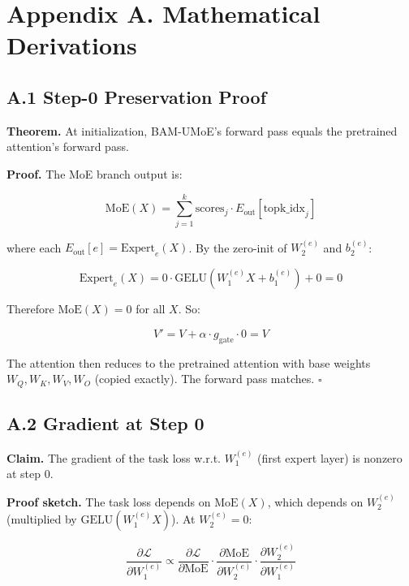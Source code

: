 \section{Appendix A. Mathematical Derivations}

\subsection{A.1 Step-0 Preservation Proof}

\textbf{Theorem.} At initialization, BAM-UMoE's forward pass equals the pretrained 
attention's forward pass.

\textbf{Proof.} The MoE branch output is:

\begin{equation}
\text{MoE}(X) = \sum_{j=1}^{k} \text{scores}_j \cdot E_{\text{out}}[\text{topk\_idx}_j]
\end{equation}

where each $E_\text{out}[e] = \text{Expert}_e(X)$. By the zero-init of 
$W_2^{(e)}$ and $b_2^{(e)}$:

\begin{equation}
\text{Expert}_e(X) = 0 \cdot \text{GELU}(W_1^{(e)} X + b_1^{(e)}) + 0 = 0
\end{equation}

Therefore $\text{MoE}(X) = 0$ for all $X$. So:

\begin{equation}
V' = V + \alpha \cdot g_\text{gate} \cdot 0 = V
\end{equation}

The attention then reduces to the pretrained attention with base weights 
$W_Q, W_K, W_V, W_O$ (copied exactly). The forward pass matches. $\square$

\subsection{A.2 Gradient at Step 0}

\textbf{Claim.} The gradient of the task loss w.r.t. $W_1^{(e)}$ (first expert 
layer) is nonzero at step 0.

\textbf{Proof sketch.} The task loss depends on $\text{MoE}(X)$, which depends 
on $W_2^{(e)}$ (multiplied by $\text{GELU}(W_1^{(e)} X)$). At $W_2^{(e)} = 0$:

\begin{equation}
\frac{\partial \mathcal{L}}{\partial W_1^{(e)}} \propto \frac{\partial \mathcal{L}}{\partial \text{MoE}} \cdot \frac{\partial \text{MoE}}{\partial W_2^{(e)}} \cdot \frac{\partial W_2^{(e)}}{\partial W_1^{(e)}}
\end{equation}

